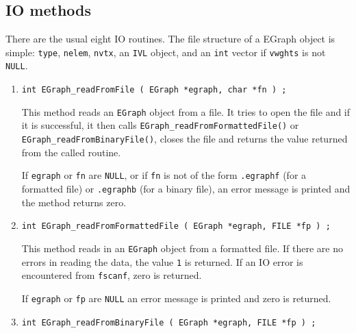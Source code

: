 \subsection{IO methods}
\label{subsection:EGraph:proto:IO}
\par
There are the usual eight IO routines.
The file structure of a EGraph object is simple:
{\tt type}, {\tt nelem}, {\tt nvtx},
an {\tt IVL} object,
and an {\tt int} vector if {\tt vwghts} is not {\tt NULL}.
\par
\begin{enumerate}
\item
\begin{verbatim}
int EGraph_readFromFile ( EGraph *egraph, char *fn ) ;
\end{verbatim}
\par
This method reads an {\tt EGraph} object from a file.
It tries to open the file and if it is successful, 
it then calls {\tt EGraph\_readFromFormattedFile()} or
{\tt EGraph\_readFromBinaryFile()}, 
closes the file
and returns the value returned from the called routine.
\par {}
If {\tt egraph} or {\tt fn} are {\tt NULL}, 
or if {\tt fn} is not of the form
{\tt *.egraphf} (for a formatted file) 
or {\tt *.egraphb} (for a binary file),
an error message is printed and the method returns zero.
\item
\begin{verbatim}
int EGraph_readFromFormattedFile ( EGraph *egraph, FILE *fp ) ;
\end{verbatim}
\par
This method reads in an {\tt EGraph} object from a formatted file.
If there are no errors in reading the data, 
the value {\tt 1} is returned.
If an IO error is encountered from {\tt fscanf}, zero is returned.
\par {}
If {\tt egraph} or {\tt fp} are {\tt NULL} 
an error message is printed and zero is returned.
\item
\begin{verbatim}
int EGraph_readFromBinaryFile ( EGraph *egraph, FILE *fp ) ;

\end{verbatim}
\end{enumerate}
